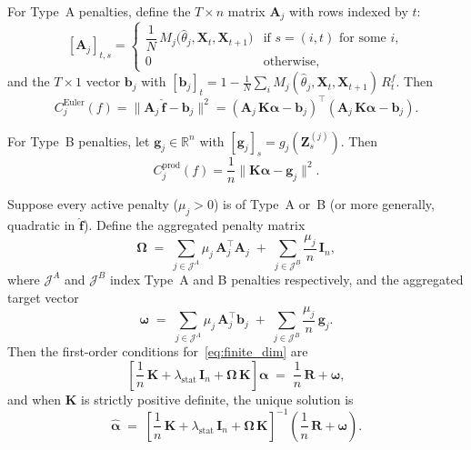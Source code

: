 For Type~A penalties, define the $T \times n$ matrix $\mathbf{A}_j$
with rows indexed by $t$:
\begin{equation}
\label{eq:A_matrix}
[\mathbf{A}_j]_{t,s} =
\begin{cases}
\dfrac{1}{N}\, M_j\bigl(\hat{\theta}_j, \mathbf{X}_t, \mathbf{X}_{t+1}\bigr)
& \text{if } s = (i,t) \text{ for some } i, \\[4pt]
0 & \text{otherwise},
\end{cases}
\end{equation}
and the $T \times 1$ vector $\mathbf{b}_j$ with
$[\mathbf{b}_j]_t = 1 - \frac{1}{N}\sum_i M_j(\hat{\theta}_j,
\mathbf{X}_t, \mathbf{X}_{t+1})\, R_t^f$.
Then
\begin{equation}
\label{eq:euler_quad}
C_j^{\mathrm{Euler}}(f) =
\|\mathbf{A}_j\, \hat{\mathbf{f}} - \mathbf{b}_j\|^2
= (\mathbf{A}_j\, \mathbf{K}\boldsymbol{\alpha} - \mathbf{b}_j)^\top
  (\mathbf{A}_j\, \mathbf{K}\boldsymbol{\alpha} - \mathbf{b}_j).
\end{equation}

For Type~B penalties, let $\mathbf{g}_j \in \mathbb{R}^n$ with
$[\mathbf{g}_j]_s = g_j(\mathbf{Z}_s^{(j)})$.  Then
\begin{equation}
\label{eq:prod_quad}
C_j^{\mathrm{prod}}(f) =
\frac{1}{n}\|\mathbf{K}\boldsymbol{\alpha} - \mathbf{g}_j\|^2.
\end{equation}

\begin{proposition}
\label{prop:foc}
Suppose every active penalty ($\mu_j > 0$) is of Type~A or~B
(or more generally, quadratic in $\hat{\mathbf{f}}$).
Define the aggregated penalty matrix
\begin{equation}
\label{eq:Omega}
\boldsymbol{\Omega} \;=\;
\sum_{j \in \mathcal{J}^A} \mu_j\, \mathbf{A}_j^\top \mathbf{A}_j
\;+\;
\sum_{j \in \mathcal{J}^B} \frac{\mu_j}{n}\, \mathbf{I}_n,
\end{equation}
where $\mathcal{J}^A$ and $\mathcal{J}^B$ index
Type~A and B penalties respectively, and the aggregated target vector
\begin{equation}
\label{eq:omega_vec}
\boldsymbol{\omega} \;=\;
\sum_{j \in \mathcal{J}^A} \mu_j\, \mathbf{A}_j^\top \mathbf{b}_j
\;+\;
\sum_{j \in \mathcal{J}^B} \frac{\mu_j}{n}\, \mathbf{g}_j.
\end{equation}
Then the first-order conditions for~\eqref{eq:finite_dim} are
\begin{equation}
\label{eq:foc}
\left[
\frac{1}{n}\,\mathbf{K}
+ \lambda_{\mathrm{stat}}\,\mathbf{I}_n
+ \boldsymbol{\Omega}\,\mathbf{K}
\right] \boldsymbol{\alpha}
\;=\;
\frac{1}{n}\,\mathbf{R}
+ \boldsymbol{\omega},
\end{equation}
and when $\mathbf{K}$ is strictly positive definite, the unique solution is
\begin{equation}
\label{eq:alpha_star}
\hat{\boldsymbol{\alpha}} \;=\;
\left[
\frac{1}{n}\,\mathbf{K}
+ \lambda_{\mathrm{stat}}\,\mathbf{I}_n
+ \boldsymbol{\Omega}\,\mathbf{K}
\right]^{-1}
\left(
\frac{1}{n}\,\mathbf{R} + \boldsymbol{\omega}
\right).
\end{equation}
\end{proposition}

